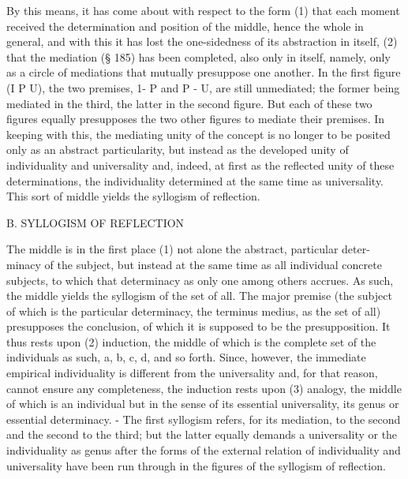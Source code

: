 By this means, it has come about with respect to the form (1) that each
moment received the determination and position of the middle, hence
the whole in general, and with this it has lost the one-sidedness of its
abstraction in itself, (2) that the mediation (§ 185) has been
completed, also only in itself, namely, only as a circle of mediations that
mutually presuppose one another. In the first figure (I P U), the two
premises, 1- P and P - U, are still unmediated; the former being mediated
in the third, the latter in the second figure. But each of these two figures
equally presupposes the two other figures to mediate their premises.
In keeping with this, the mediating unity of the concept is no longer
to be posited only as an abstract particularity, but instead as the developed
unity of individuality and universality and, indeed, at first as the reflected
unity of these determinations, the individuality determined at the same time
as universality. This sort of middle yields the syllogism of reflection.

B. SYLLOGISM OF REFLECTION

The middle is in the first place (1) not alone the abstract, particular deter-
minacy of the subject, but instead at the same time as all individual concrete
subjects, to which that determinacy as only one among others accrues. As
such, the middle yields the syllogism of the set of all.
The major premise (the subject of which is the particular determinacy, the
terminus medius, as the set of all) presupposes the conclusion, of which it
is supposed to be the presupposition. It thus rests upon (2) induction, the
middle of which is the complete set of the individuals as such, a,
b, c, d, and so forth. Since, however, the immediate empirical individuality
is different from the universality and, for that reason, cannot ensure any
completeness, the induction rests upon (3) analogy, the middle of which
is an individual but in the sense of its essential universality, its genus or
essential determinacy. - The first syllogism refers, for its mediation, to
the second and the second to the third; but the latter equally demands a
universality or the individuality as genus after the forms of the external
relation of individuality and universality have been run through in the
figures of the syllogism of reflection.

